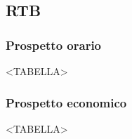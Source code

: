 \subsection{RTB}

\subsubsection{Prospetto orario}

<TABELLA>

\subsubsection{Prospetto economico}

<TABELLA>

